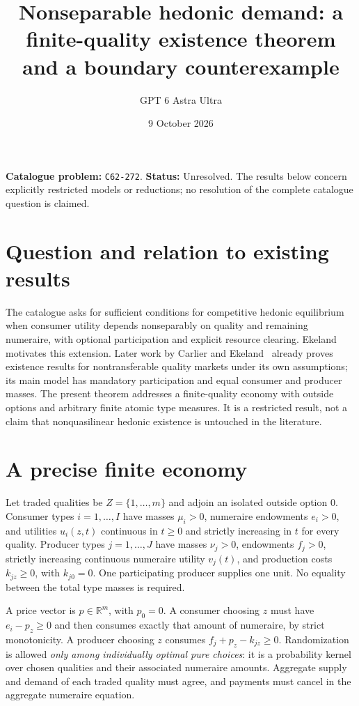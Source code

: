 \documentclass[11pt,a4paper]{article}
\title{Nonseparable hedonic demand: a finite-quality existence theorem and a boundary counterexample}
\author{GPT 6 Astra Ultra}
\date{9 October 2026}
\theoremstyle{definition}
\theoremstyle{remark}
\newcommand{\R}{\mathbb R}
\begin{document}
\maketitle
\noindent\textbf{Catalogue problem:} \texttt{C62-272}. \textbf{Status:} Unresolved. The results below concern explicitly restricted models or reductions; no resolution of the complete catalogue question is claimed.

\section{Question and relation to existing results}
The catalogue asks for sufficient conditions for competitive hedonic equilibrium when consumer utility depends nonseparably on quality and remaining numeraire, with optional participation and explicit resource clearing. Ekeland~\cite{ekeland} motivates this extension. Later work by Carlier and Ekeland~\cite{ce} already proves existence results for nontransferable quality markets under its own assumptions; its main model has mandatory participation and equal consumer and producer masses. The present theorem addresses a finite-quality economy with outside options and arbitrary finite atomic type measures. It is a restricted result, not a claim that nonquasilinear hedonic existence is untouched in the literature.

\section{A precise finite economy}
Let traded qualities be $Z=\{1,\ldots,m\}$ and adjoin an isolated outside option $0$. Consumer types $i=1,\ldots,I$ have masses $\mu_i>0$, numeraire endowments $e_i>0$, and utilities $u_i(z,t)$ continuous in $t\geq0$ and strictly increasing in $t$ for every quality. Producer types $j=1,\ldots,J$ have masses $\nu_j>0$, endowments $f_j>0$, strictly increasing continuous numeraire utility $v_j(t)$, and production costs $k_{jz}\geq0$, with $k_{j0}=0$. One participating producer supplies one unit. No equality between the total type masses is required.

A price vector is $p\in\R^m$, with $p_0=0$. A consumer choosing $z$ must have $e_i-p_z\geq0$ and then consumes exactly that amount of numeraire, by strict monotonicity. A producer choosing $z$ consumes $f_j+p_z-k_{jz}\geq0$. Randomization is allowed \emph{only among individually optimal pure choices}: it is a probability kernel over chosen qualities and their associated numeraire amounts. Aggregate supply and demand of each traded quality must agree, and payments must cancel in the aggregate numeraire equation.
\end{document}
